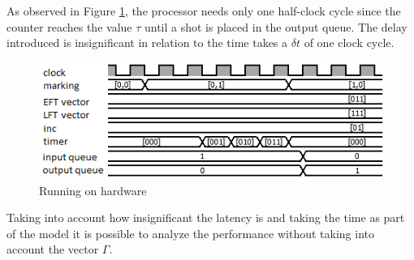 	As observed in Figure \ref{fig:simulation}, the processor needs only one half-clock cycle since the 
	counter reaches the value $\tau$ until a shot is placed in the output queue. The delay introduced is 
	insignificant in relation to the time takes a $\delta t$ of one clock cycle.
	
		\begin{figure}[h]
			\centering
			\includegraphics[width=0.95\linewidth]{./img/time}
			\caption{Running on hardware}
			\label{fig:simulation}
		\end{figure} 	
	
	Taking into account how insignificant the latency is and taking the time as part of the model it 
	is possible to analyze the performance without taking into account the vector $\Gamma$.	
	